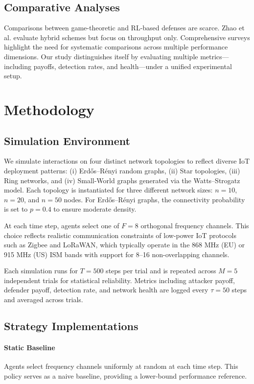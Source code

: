\documentclass[conference]{IEEEtran}
\begin{document}
\subsection{Comparative Analyses}
Comparisons between game-theoretic and RL-based defenses are scarce. Zhao et al. \cite{zhao2020hybrid} evaluate hybrid schemes but focus on throughput only. Comprehensive surveys \cite{survey2022jamming} highlight the need for systematic comparisons across multiple performance dimensions. Our study distinguishes itself by evaluating multiple metrics—including payoffs, detection rates, and health—under a unified experimental setup.

\section{Methodology}
\subsection{Simulation Environment}
We simulate interactions on four distinct network topologies to reflect diverse IoT deployment patterns: (i) Erd\H{o}s--R\'enyi random graphs, (ii) Star topologies, (iii) Ring networks, and (iv) Small-World graphs generated via the Watts–Strogatz model. Each topology is instantiated for three different network sizes: $n = 10$, $n = 20$, and $n = 50$ nodes. For Erd\H{o}s--R\'enyi graphs, the connectivity probability is set to $p=0.4$ to ensure moderate density.

At each time step, agents select one of $F=8$ orthogonal frequency channels. This choice reflects realistic communication constraints of low-power IoT protocols such as Zigbee and LoRaWAN, which typically operate in the 868 MHz (EU) or 915 MHz (US) ISM bands with support for 8–16 non-overlapping channels.

Each simulation runs for $T=500$ steps per trial and is repeated across $M=5$ independent trials for statistical reliability. Metrics including attacker payoff, defender payoff, detection rate, and network health are logged every $\tau = 50$ steps and averaged across trials.

\subsection{Strategy Implementations}
\paragraph{Static Baseline} Agents select frequency channels uniformly at random at each time step. This policy serves as a naive baseline, providing a lower-bound performance reference.
\end{document}
